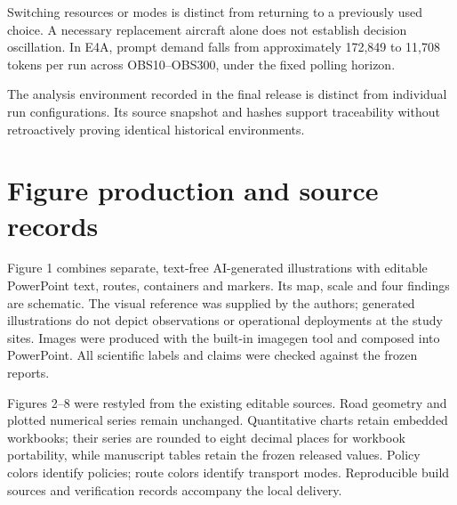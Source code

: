 \documentclass[11pt,a4paper]{article}
\begin{document}
Switching resources or modes is distinct from returning to a previously used choice. A necessary replacement aircraft alone does not establish decision oscillation. In E4A, prompt demand falls from approximately 172,849 to 11,708 tokens per run across OBS10--OBS300, under the fixed polling horizon.

The analysis environment recorded in the final release is distinct from individual run configurations. Its source snapshot and hashes support traceability without retroactively proving identical historical environments.

\section{Figure production and source records}

Figure 1 combines separate, text-free AI-generated illustrations with editable PowerPoint text, routes, containers and markers. Its map, scale and four findings are schematic. The visual reference was supplied by the authors; generated illustrations do not depict observations or operational deployments at the study sites. Images were produced with the built-in imagegen tool and composed into PowerPoint. All scientific labels and claims were checked against the frozen reports.

Figures 2--8 were restyled from the existing editable sources. Road geometry and plotted numerical series remain unchanged. Quantitative charts retain embedded workbooks; their series are rounded to eight decimal places for workbook portability, while manuscript tables retain the frozen released values. Policy colors identify policies; route colors identify transport modes. Reproducible build sources and verification records accompany the local delivery.

\FloatBarrier
\end{document}
